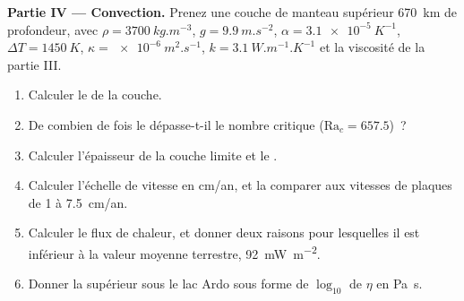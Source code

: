\begin{problem}
\medskip\noindent\textbf{Partie IV --- Convection.} Prenez une couche de manteau supérieur
\qty{670}{km} de profondeur, avec $\rho = \qty{3700}{kg.m^{-3}}$, $g =
\qty{9.9}{m.s^{-2}}$, $\alpha = \qty{3.1e-5}{K^{-1}}$, $\Delta T =
\qty{1450}{K}$, $\kappa = \qty{e-6}{m^2.s^{-1}}$, $k = \qty{3.1}{W.m^{-1}.K^{-1}}$
et la viscosité de la partie III.
\begin{enumerate}[resume]
  \item Calculer le  de la couche.
  \item De combien de fois le  dépasse-t-il le nombre critique ($\mathrm{Ra}_c = 657.5$)~?
  \item Calculer l'épaisseur de la couche limite et le .
  \item Calculer l'échelle de vitesse en \unit{cm/an}, et la comparer aux vitesses de plaques
        de 1 à \qty{7.5}{cm/an}.
  \item Calculer le flux de chaleur, et donner deux raisons pour lesquelles il est inférieur à la
        valeur moyenne terrestre, \qty{92}{mW.m^{-2}}.
  \item Donner la  supérieur sous le lac Ardo sous forme de $\log_{10}$ de
        $\eta$ en \unit{Pa.s}.
\end{enumerate}
\end{problem}
